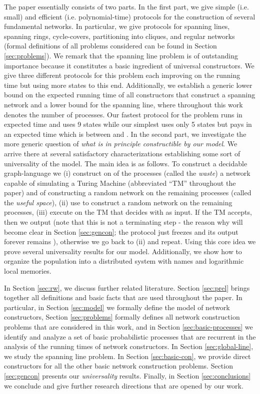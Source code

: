 \documentclass[oribibl, 11pt]{llncs}
\begin{document}
The paper essentially consists of two parts. In the first part, we give simple (i.e. small) and efficient (i.e. polynomial-time) protocols for the construction of several fundamental networks. In particular, we give protocols for spanning lines, spanning rings, cycle-covers, partitioning into cliques, and regular networks (formal definitions of all problems considered can be found in Section \ref{sec:problems}). We remark that the spanning line problem is of outstanding importance because it constitutes a basic ingredient of universal constructors. We give three different protocols for this problem each improving on the running time but using more states to this end. Additionally, we establish a  generic lower bound on the expected running time of all constructors that construct a spanning network and a  lower bound for the spanning line, where  throughout this work denotes the number of processes. Our fastest protocol for the problem runs in  expected time and uses 9 states while our simplest uses only 5 states but pays in an expected time which is between  and . In the second part, we investigate the more generic question of \emph{what is in principle constructible by our model}. We arrive there at several satisfactory characterizations establishing some sort of universality of the model. The main idea is as follows. To construct a decidable graph-language  we (i) construct on  of the processes (called the \emph{waste}) a network  capable of simulating a Turing Machine (abbreviated ``TM'' throughout the paper) and of constructing a random network on the remaining  processes (called the \emph{useful space}), (ii) use  to construct a random network  on the remaining  processes, (iii) execute on  the TM that decides  with  as input. If the TM accepts, then we output  (note that this is not a terminating step - the reason why will become clear in Section \ref{sec:gencon}; the protocol just freezes and its output forever remains ), otherwise we go back to (ii) and repeat. Using this core idea we prove several universality results for our model. Additionally, we show how to organize the population into a distributed system with names and logarithmic local memories.

In Section \ref{sec:rw}, we discuss further related literature. Section \ref{sec:prel} brings together all definitions and basic facts that are used throughout the paper. In particular, in Section \ref{sec:model} we formally define the model of network constructors, Section \ref{sec:problems} formally defines all network construction problems that are considered in this work, and in Section \ref{sec:basic-processes} we identify and analyze a set of basic probabilistic processes that are recurrent in the analysis of the running times of network constructors. In Section \ref{sec:global-line}, we study the spanning line problem. In Section \ref{sec:basic-con}, we provide direct constructors for all the other basic network construction problems. Section \ref{sec:gencon} presents our \emph{universality} results. Finally, in Section \ref{sec:conclusions} we conclude and give further research directions that are opened by our work.
\end{document}
